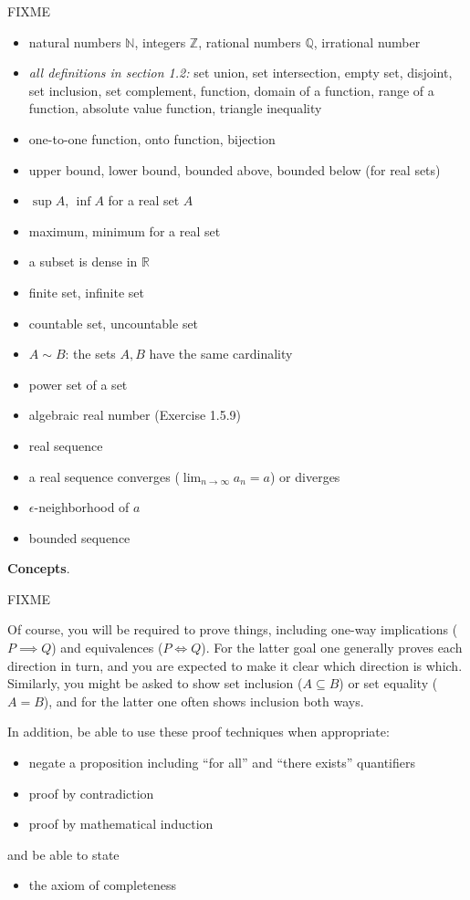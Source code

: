 \documentclass[12pt]{amsart}
\newcommand{\NN}{{\mathbb{N}}}
\newcommand{\QQ}{{\mathbb{Q}}}
\newcommand{\RR}{{\mathbb{R}}}
\newcommand{\ZZ}{{\mathbb{Z}}}
\newcommand{\eps}{\epsilon}
\begin{document}
FIXME
\begin{itemize}
\item natural numbers $\NN$, integers $\ZZ$, rational numbers $\QQ$, irrational number
\item \emph{all definitions in section 1.2:} set union, set intersection, empty set, disjoint, set inclusion, set complement, function, domain of a function, range of a function, absolute value function, triangle inequality
\item one-to-one function, onto function, bijection
\item upper bound, lower bound, bounded above, bounded below (for real sets)
\item $\sup A$, $\inf A$ for a real set $A$
\item maximum, minimum for a real set
\item a subset is dense in $\RR$
\item finite set, infinite set
\item countable set, uncountable set
\item $A\sim B$: the sets $A,B$ have the same cardinality
\item power set of a set
\item algebraic real number (Exercise 1.5.9)
\item real sequence
\item a real sequence converges ($\lim_{n\to\infty} a_n = a$) or diverges
\item $\eps$-neighborhood of $a$
\item bounded sequence
\end{itemize}

\bigskip
\noindent \textbf{Concepts}.  

FIXME

Of course, you will be required to prove things, including one-way implications ($P\implies Q$) and equivalences ($P\iff Q$).  For the latter goal one generally proves each direction in turn, and you are expected to make it clear which direction is which.  Similarly, you might be asked to show set inclusion ($A \subseteq B$) or set equality ($A=B$), and for the latter one often shows inclusion both ways.

In addition, be able to use these proof techniques when appropriate:
\begin{itemize}
\item negate a proposition including ``for all'' and ``there exists'' quantifiers
\item proof by contradiction
\item proof by mathematical induction
\end{itemize}
and be able to state
\begin{itemize}
\item the axiom of completeness
\end{itemize}
\bigskip
\end{document}
